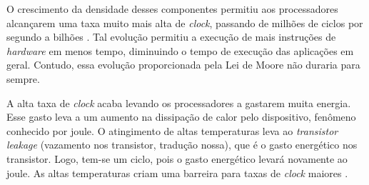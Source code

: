 O crescimento da densidade desses componentes permitiu aos processadores alcançarem
uma taxa muito mais alta de \textit{clock}, passando de milhões de ciclos por segundo
a bilhões \cite{Hennessy-2}. Tal evolução permitiu a execução de mais instruções de
\textit{hardware} em menos tempo, diminuindo o tempo de execução das aplicações em geral.
Contudo, essa evolução proporcionada pela Lei de Moore não duraria para sempre.

A alta taxa de \textit{clock} acaba levando os processadores a gastarem muita energia.
Esse gasto leva a um aumento na dissipação de calor pelo dispositivo, fenômeno conhecido
por \gls{joule}. O atingimento de altas temperaturas leva ao \textit{transistor leakage} \cite{transistor-leakage}
(vazamento nos \gls{transistor}, tradução nossa), que é o gasto energético nos \gls{transistor}.
Logo, tem-se um ciclo, pois o gasto energético levará novamente ao \gls{joule}. As altas 
temperaturas criam uma barreira para taxas de \textit{clock} maiores \cite{Fish:FoCPowerWall}.